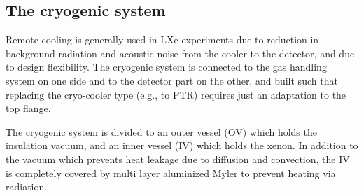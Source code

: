 \subsection{The cryogenic system}
\label{subsec:cryo}

Remote cooling is generally used in LXe experiments due to reduction in background radiation and acoustic noise from the cooler to the detector, and due to design flexibility. The cryogenic system is connected to the gas handling system on 
one side and to the detector part on the other, and built such that replacing the cryo-cooler type (e.g., to PTR) requires just an adaptation to the top flange.


The cryogenic system is divided to an outer vessel (OV) which holds 
the insulation vacuum, and an inner vessel (IV) which holds the xenon. In addition to the vacuum which prevents heat leakage due to diffusion and convection, the IV is completely covered by multi layer aluminized Myler to prevent heating via radiation.  

